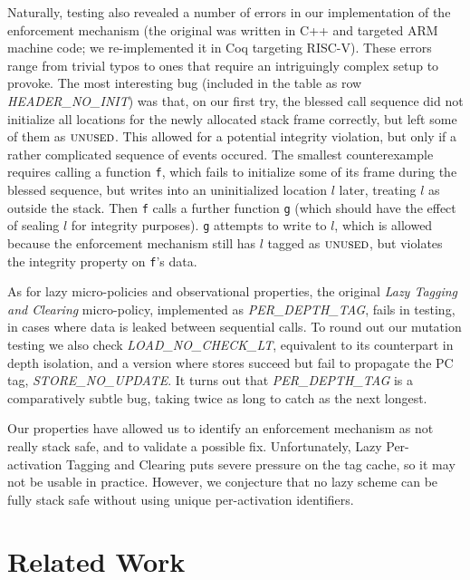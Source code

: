 \documentclass[10pt,conference]{ieeetran}%
\theoremstyle{definition}
\begin{document}
Naturally, testing also revealed a number of errors in our
implementation of the enforcement mechanism (the original was written in C++
and targeted ARM machine code;
we re-implemented it in Coq targeting RISC-V).  These errors range
from trivial typos to ones that require an intriguingly complex setup
to provoke.  The most interesting bug (included in the table as row
{\em HEADER\_NO\_INIT}) was that, on our first try, the blessed call
sequence %
did not initialize all locations for the
newly allocated stack frame correctly, but left some of them as
$\textsc{unused}$. This allowed for a potential integrity violation, but
only if a rather complicated sequence of events occured.
The smallest counterexample requires calling a function {\tt f},
which fails to initialize some of its frame during the blessed sequence,
but writes into an uninitialized location $l$ later, treating \(l\) as outside
the stack. Then {\tt f} calls a further function {\tt g} (which should have
the effect of sealing $l$ for integrity purposes). {\tt g} attempts to write to $l$,
which is allowed because the enforcement mechanism still has
$l$ tagged as $\textsc{unused}$, but violates the integrity property on {\tt f}'s data.

As for lazy micro-policies and observational properties,
the original {\em Lazy Tagging and Clearing} micro-policy, implemented as {\em PER\_DEPTH\_TAG},
fails in testing, in cases where data is leaked between sequential calls.
To round out our mutation testing we also check {\em LOAD\_NO\_CHECK\_LT},
equivalent to its counterpart in depth isolation,
and a version where stores succeed but fail to propagate the PC tag, {\em STORE\_NO\_UPDATE}.
It turns out that {\em PER\_DEPTH\_TAG} is a comparatively subtle bug,
taking twice as long to catch as the next longest.

Our properties have allowed us to identify an enforcement mechanism as
not really stack safe, and to validate a possible fix.
Unfortunately, Lazy Per-activation Tagging and Clearing
puts severe pressure on the tag cache, so it may not be usable in practice.
However, we conjecture that no lazy scheme can be fully stack safe
without using unique per-activation identifiers.

\section{Related Work}
\label{sec:relwork}
\end{document}
